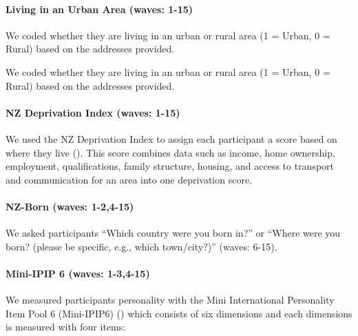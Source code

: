 \documentclass[
  singlecolumn,
  9pt]{article}
\let\oldparagraph\paragraph
\renewcommand{\paragraph}[1]{\oldparagraph{#1}\mbox{}}
\begin{document}
\paragraph{Living in an Urban Area (waves:
1-15)}\label{living-in-an-urban-area-waves-1-15}

We coded whether they are living in an urban or rural area (1 = Urban, 0
= Rural) based on the addresses provided.

We coded whether they are living in an urban or rural area (1 = Urban, 0
= Rural) based on the addresses provided.

\paragraph{NZ Deprivation Index (waves:
1-15)}\label{nz-deprivation-index-waves-1-15}

We used the NZ Deprivation Index to assign each participant a score
based on where they live (). This score combines data such as income, home ownership,
employment, qualifications, family structure, housing, and access to
transport and communication for an area into one deprivation score.

\paragraph{NZ-Born (waves: 1-2,4-15)}\label{nz-born-waves-1-24-15}

We asked participants ``Which country were you born in?'' or ``Where
were you born? (please be specific, e.g., which town/city?)'' (waves:
6-15).

\paragraph{Mini-IPIP 6 (waves:
1-3,4-15)}\label{mini-ipip-6-waves-1-34-15}

We measured participants personality with the Mini International
Personality Item Pool 6 (Mini-IPIP6) () which consists of six dimensions and each
dimensions is measured with four items:
\end{document}
